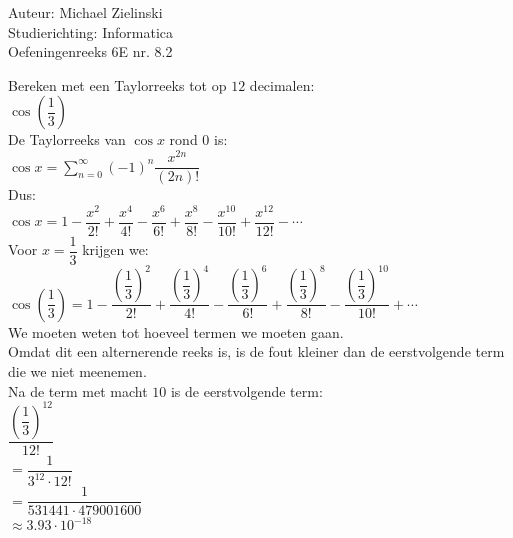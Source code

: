 \documentclass[a4paper]{article}
\begin{document}
  
\noindent \large Auteur: Michael Zielinski \\
\noindent \large Studierichting: Informatica \\
\noindent \large Oefeningenreeks 6E nr. 8.2 \\

\medskip

\normalsize

Bereken met een Taylorreeks tot op $12$ decimalen: \\

$ \cos\left(\dfrac{1}{3}\right) $ \\

De Taylorreeks van $\cos x$ rond $0$ is: \\

$ \cos x = \displaystyle\sum_{n=0}^{\infty}(-1)^n\dfrac{x^{2n}}{(2n)!} $ \\

Dus: \\

$ \cos x = 1-\dfrac{x^2}{2!}+\dfrac{x^4}{4!}-\dfrac{x^6}{6!}+\dfrac{x^8}{8!}-\dfrac{x^{10}}{10!}+\dfrac{x^{12}}{12!}-\cdots $ \\

Voor $x=\dfrac{1}{3}$ krijgen we: \\

$ \cos\left(\dfrac{1}{3}\right)
= 1-\dfrac{\left(\dfrac{1}{3}\right)^2}{2!}
+\dfrac{\left(\dfrac{1}{3}\right)^4}{4!}
-\dfrac{\left(\dfrac{1}{3}\right)^6}{6!}
+\dfrac{\left(\dfrac{1}{3}\right)^8}{8!}
-\dfrac{\left(\dfrac{1}{3}\right)^{10}}{10!}
+\cdots $ \\

We moeten weten tot hoeveel termen we moeten gaan. \\

Omdat dit een alternerende reeks is, is de fout kleiner dan de eerstvolgende term die we niet meenemen. \\

Na de term met macht $10$ is de eerstvolgende term: \\

$ \dfrac{\left(\dfrac{1}{3}\right)^{12}}{12!} $ \\

$ = \dfrac{1}{3^{12}\cdot 12!} $ \\

$ = \dfrac{1}{531441\cdot 479001600} $ \\

$ \approx 3.93\cdot 10^{-18} $ \\
\end{document}
